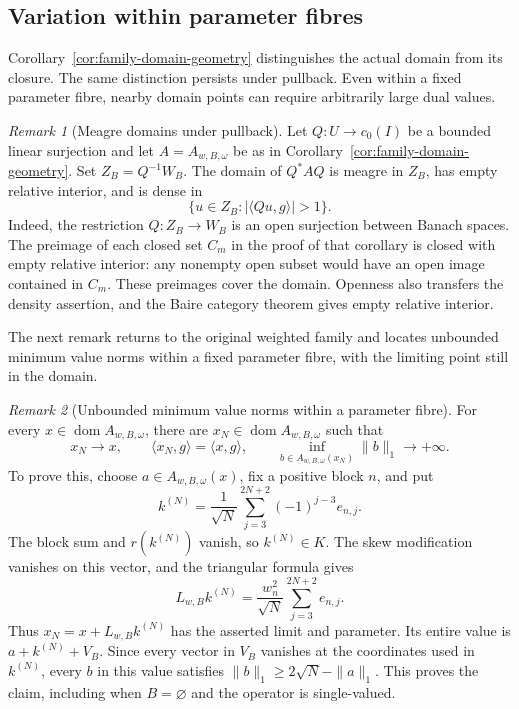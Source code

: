 \documentclass[11pt]{article}
\newcommand{\dom}{\operatorname{dom}}
\newcommand{\pair}[2]{\langle #1,#2\rangle}
\theoremstyle{definition}
\theoremstyle{remark}
\newtheorem{remark}{Remark}
\begin{document}
\subsection{Variation within parameter fibres}
\label{subsec:appendix-fibre-variation}

Corollary~\ref{cor:family-domain-geometry} distinguishes the actual domain from its closure. The same distinction persists under pullback. Even within a fixed parameter fibre, nearby domain points can require arbitrarily large dual values.

\begin{remark}[Meagre domains under pullback]
\label{rem:meagre-pullback}
Let $Q:U\to c_0(I)$ be a bounded linear surjection and let $A=A_{w,B,\omega}$ be as in Corollary~\ref{cor:family-domain-geometry}. Set $Z_B=Q^{-1}W_B$. The domain of $Q^*AQ$ is meagre in $Z_B$, has empty relative interior, and is dense in
\[
\{u\in Z_B:|\pair{Qu}{g}|>1\}.
\]
Indeed, the restriction $Q:Z_B\to W_B$ is an open surjection between Banach spaces. The preimage of each closed set $C_m$ in the proof of that corollary is closed with empty relative interior: any nonempty open subset would have an open image contained in $C_m$. These preimages cover the domain. Openness also transfers the density assertion, and the Baire category theorem gives empty relative interior.
\end{remark}

The next remark returns to the original weighted family and locates unbounded minimum value norms within a fixed parameter fibre, with the limiting point still in the domain.

\begin{remark}[Unbounded minimum value norms within a parameter fibre]
\label{rem:fibre-minimum-norm}
For every $x\in\dom A_{w,B,\omega}$, there are $x_N\in\dom A_{w,B,\omega}$ such that
\[
x_N\longrightarrow x,\qquad
\pair{x_N}{g}=\pair{x}{g},\qquad
\inf_{b\in A_{w,B,\omega}(x_N)}\|b\|_1\longrightarrow+\infty.
\]
To prove this, choose $a\in A_{w,B,\omega}(x)$, fix a positive block $n$, and put
\[
k^{(N)}=\frac1{\sqrt N}\sum_{j=3}^{2N+2}(-1)^{j-3}e_{n,j}.
\]
The block sum and $r(k^{(N)})$ vanish, so $k^{(N)}\in K$. The skew modification vanishes on this vector, and the triangular formula gives
\[
L_{w,B}k^{(N)}=\frac{w_n^2}{\sqrt N}\sum_{j=3}^{2N+2}e_{n,j}.
\]
Thus $x_N=x+L_{w,B}k^{(N)}$ has the asserted limit and parameter. Its entire value is $a+k^{(N)}+V_B$. Since every vector in $V_B$ vanishes at the coordinates used in $k^{(N)}$, every $b$ in this value satisfies $\|b\|_1\ge2\sqrt N-\|a\|_1$. This proves the claim, including when $B=\varnothing$ and the operator is single-valued.
\end{remark}
\end{document}
